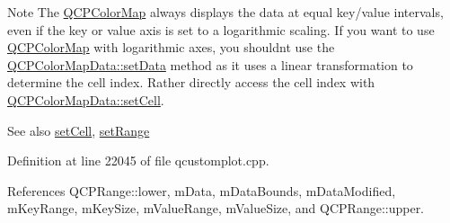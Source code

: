 \begin{DoxyNote}{Note}
The \hyperlink{class_q_c_p_color_map}{Q\+C\+P\+Color\+Map} always displays the data at equal key/value intervals, even if the key or value axis is set to a logarithmic scaling. If you want to use \hyperlink{class_q_c_p_color_map}{Q\+C\+P\+Color\+Map} with logarithmic axes, you shouldn\textquotesingle{}t use the \hyperlink{class_q_c_p_color_map_data_afd2083ccfd6987ec94aa7ef8e91ca39a}{Q\+C\+P\+Color\+Map\+Data\+::set\+Data} method as it uses a linear transformation to determine the cell index. Rather directly access the cell index with \hyperlink{class_q_c_p_color_map_data_a8e75eaf8746596319032a93f3d2d0683}{Q\+C\+P\+Color\+Map\+Data\+::set\+Cell}.
\end{DoxyNote}
\begin{DoxySeeAlso}{See also}
\hyperlink{class_q_c_p_color_map_data_a8e75eaf8746596319032a93f3d2d0683}{set\+Cell}, \hyperlink{class_q_c_p_color_map_data_aad9c1c7c703c1339489fc730517c83d4}{set\+Range} 
\end{DoxySeeAlso}


Definition at line 22045 of file qcustomplot.\+cpp.



References Q\+C\+P\+Range\+::lower, m\+Data, m\+Data\+Bounds, m\+Data\+Modified, m\+Key\+Range, m\+Key\+Size, m\+Value\+Range, m\+Value\+Size, and Q\+C\+P\+Range\+::upper.


